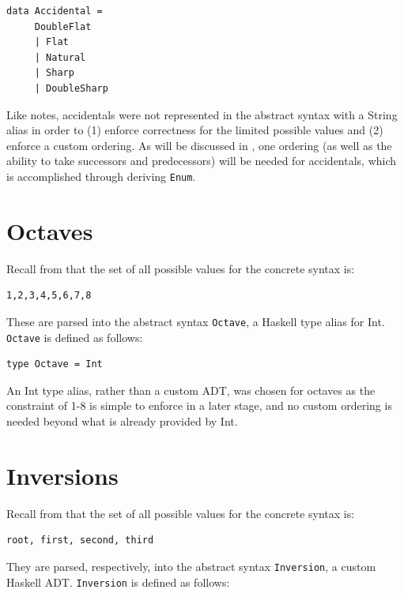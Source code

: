 \documentclass{report}
\newcommand\param[1]{\textttu{<#1>}}
\begin{document}
\begin{verbatim}
data Accidental = 
     DoubleFlat 
     | Flat 
     | Natural
     | Sharp
     | DoubleSharp
\end{verbatim}

Like notes, accidentals were not represented in the abstract syntax with a String alias in order to (1) enforce correctness for the limited possible values and (2) enforce a custom ordering. As will be discussed in , one ordering (as well as the ability to take successors and predecessors) will be needed for accidentals, which is accomplished through deriving \verb.Enum..
\section{Octaves}
Recall from  that the set of all possible values for the concrete syntax \param{ACCIDENTAL} is:
\begin{verbatim}
1,2,3,4,5,6,7,8
\end{verbatim}

These are parsed into the abstract syntax \verb.Octave., a Haskell type alias for Int. \verb.Octave. is defined as follows:

\begin{verbatim}
type Octave = Int
\end{verbatim}

An Int type alias, rather than a custom ADT, was chosen for octaves as the constraint of  1-8 is simple to enforce in a later stage, and no custom ordering is needed beyond what is already provided by Int.
\section{Inversions}
Recall from  that the set of all possible values for the concrete syntax \param{INVERSION} is:
\begin{verbatim}
root, first, second, third
\end{verbatim}

They are parsed, respectively, into the abstract syntax \verb.Inversion., a custom Haskell ADT. \verb.Inversion. is defined as follows:
\end{document}
